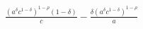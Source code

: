 $\displaystyle \frac{\left(a^{\delta} c^{1 - \delta}\right)^{1 - \rho} \left(1 - \delta\right)}{c} - \frac{\delta \left(a^{\delta} c^{1 - \delta}\right)^{1 - \rho}}{a}$